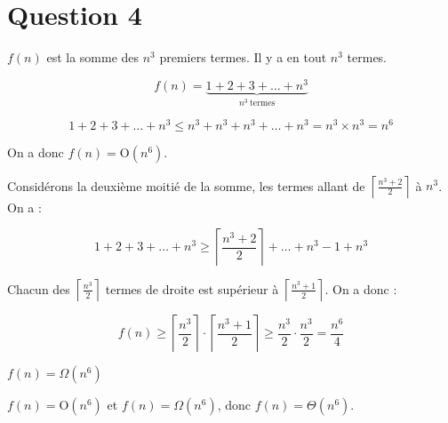 \section*{Question 4}
$f(n)$ est la somme des $n^3$ premiers termes. Il y a en tout $n^3$ termes.

\[f(n) = \underbrace{1 + 2 + 3 + \dots + n^3}_{n^3\ \text{termes}}\]

\[1 + 2 + 3 + \dots + n^3 \leq n^3 + n^3 + n^3 + \dots + n^3 = n^3 \times n^3 = n^6\]

On a donc $f(n) = \mathrm{O} (n^6)$.

Considérons la deuxième moitié de la somme, les termes allant de $\left\lceil \frac{n^3+2}{2} \right\rceil$ à $n^3$. On a :

\[1 + 2 + 3 + \dots + n^3 \geq \left\lceil\frac{n^3+2}{2}\right\rceil + \dots + n^3 -1 + n^3\]

Chacun des $\left\lceil \frac{n^3}{2} \right\rceil$ termes de droite est supérieur à $\left\lceil\frac{n^3+1}{2}\right\rceil$. On a donc :

\[ f(n) \geq \left\lceil\frac{n^3}{2}\right\rceil \cdot \left\lceil\frac{n^3+1}{2}\right\rceil \geq \frac{n^3}{2} \cdot \frac{n^3}{2} = \frac{n^6}{4}\]

$f(n) = \Omega (n^6)$

$f(n) = \mathrm{O} (n^6)$ et $f(n) = \Omega (n^6)$, donc  $f(n) = \Theta (n^6)$.